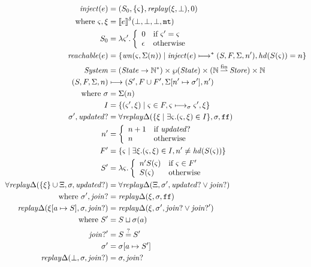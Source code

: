 \documentclass{llncs}
\newcommand{\finto}{\mathbin{\overset{\text{fin}}{\rightharpoonup}}}
\newcommand{\inject}{\mathit{inject}}
\newcommand{\setof}[1]{\{ #1 \}}
\begin{document}
\begin{align*}
\inject(\mexp) &=
 (S_0, \setof{\mstate},
  \replay(\msdiff,\bot), 0) \\
 \text{ where } \mstate, \msdiff &= \compile{e}^\mcntr(\bot,\bot,\bot,\kmt) \\
                S_0 &= \lambda\mstate'.
                        \left\{\begin{array}{ll}
                         0 & \text{if } \mstate' = \mstate \\
                         \epsilon & \text{otherwise}
                        \end{array}\right. \\
\mathit{reachable}(\mexp) &= \setof{\wn(\mstate,\Sigma(n)) \mid \inject(\mexp) \machstep^* (S,F,\Sigma,n'), \hd(S(\mstate)) = n} \\
\System &= (\State \to {\mathbb N}^*) \times \wp(\State) \times ({\mathbb N} \finto \Store) \times {\mathbb N} \\
(S,F,\Sigma,n) &\machstep (S', F \cup F', \Sigma[n' \mapsto \msto'],n') \\
 \text{ where }
 \msto &= \Sigma(n) \\
  I &= \setof{ \ttuple{\mstate'}{\msdiff} \mid \mstate \in F, \mstate \machstep_\msto \mstate', \msdiff} \\
  \msto',\updatedp &=
     \replaychangeall(\setof{\msdiff \mid \exists \mstate. (\mstate, \msdiff) \in I}, \msto,\sfalse) \\
  n' &= \left\{\begin{array}{ll}
                n + 1 & \text{if } \updatedp \\
                n & \text{otherwise}
               \end{array}\right. \\
  F' &= \setof{\mstate \mid \exists \msdiff. (\mstate,\msdiff) \in I,
                n' \neq \hd(S(\mstate))} \\
  S' &= \lambda \mstate. \left\{\begin{array}{ll}
                                 n' S(\mstate) & \text{if } \mstate \in F' \\
                                 S(\mstate) & \text{otherwise}
                                \end{array}\right. \\
  \replaychangeall(\setof{\msdiff} \cup \Xi, \msto, \updatedp) &=
    \replaychangeall(\Xi, \msto', \updatedp \vee \joinp) \\
   \text{ where } \msto', \joinp &= \replaychange(\msdiff, \msto, \sfalse) \\
  \replaychange(\msdiff[\maddr \mapsto S], \msto, \joinp) &=
   \replaychange(\msdiff, \msto', \joinp \vee \joinp') \\
  \text{ where } S' &= S \sqcup \msto(\maddr) \\
                 \joinp' &= S \deceq S' \\
                 \msto' &= \msto[\maddr \mapsto S'] \\
  \replaychange(\bot, \msto, \joinp) &= \msto, \joinp
\end{align*}
\end{document}
